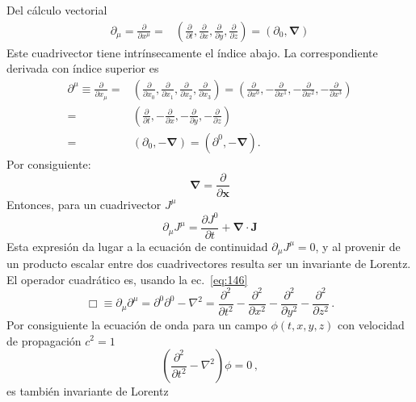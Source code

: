 \begin{frame}
  Del cálculo vectorial
  \begin{align}
      \partial_\mu=\frac{\partial}{\partial x^\mu}=&\left(
    \frac{\partial}{\partial t},\frac{\partial}{\partial x},\frac{\partial}{\partial y},\frac{\partial}{\partial z}
  \right)
  =(\partial_0,\boldsymbol{\nabla})
  \end{align}
Este cuadrivector tiene intrínsecamente el índice abajo. La correspondiente derivada con índice superior es  
\begin{align}
  \partial^\mu\equiv\frac{\partial}{\partial x_\mu}=&
  \left(
    \frac{\partial}{\partial x_0},\frac{\partial}{\partial x_1},\frac{\partial}{\partial x_2},\frac{\partial}{\partial x_3}
  \right)=\left(
    \frac{\partial}{\partial x^0},-\frac{\partial}{\partial x^1},-\frac{\partial}{\partial x^2},-\frac{\partial}{\partial x^3}
  \right)\nonumber\\
  =&\left(
    \frac{\partial}{\partial t},-\frac{\partial}{\partial x},-\frac{\partial}{\partial y},-\frac{\partial}{\partial z}
  \right)\nonumber\\
  =&(\partial_0,-\boldsymbol{\nabla})=(\partial^0,-\boldsymbol{\nabla}).
\end{align}
Por consiguiente:
\begin{equation}
  \label{eq:nabla}
  \boldsymbol{\nabla}=\frac{\partial}{\partial\mathbf{x}}
\end{equation}
Entonces, para un cuadrivector $J^{\mu}$
\begin{equation}
  \label{eq:ecncontiJ}
  \partial_\mu J^\mu=\frac{\partial J^0}{\partial t}+\boldsymbol{\nabla}\cdot\boldsymbol{J}
\end{equation}
Esta expresión da lugar a la ecuación de continuidad $\partial_\mu J^\mu=0$, y al provenir de un producto escalar entre dos cuadrivectores resulta ser un invariante de Lorentz.
El operador cuadrático es, usando la ec.~\eqref{eq:146}
\begin{equation}
  \label{eq:dalambertian}
  \Box\equiv \partial_\mu\partial^\mu=\partial^0\partial^0-\nabla^2 =\frac{\partial^2}{\partial t^2}-\frac{\partial^2}{\partial x^2}-\frac{\partial^2}{\partial y^2}-\frac{\partial^2}{\partial z^2}\,.
\end{equation}
Por consiguiente la ecuación de onda para un campo $\phi(t,x,y,z)$  con velocidad de propagación $c^2=1$
\begin{equation}
  \left(
\frac{\partial^2}{\partial t^2}-\nabla^2
  \right)\phi=0\,,
\end{equation}
es también invariante de Lorentz
\end{frame}


